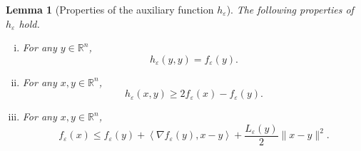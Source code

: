 \documentclass[12pt]{article}
\numberwithin{equation}{section}
\newtheorem{lemma}{Lemma}[proposition]
\begin{document}
\begin{lemma}[Properties of the auxiliary function $h_{\varepsilon}$]\label{State_h_prop}
The following properties of $h_{\varepsilon}$ hold.
\begin{enumerate}[(i)]
	\item For any $y \in \mathbb{R}^n$, \label{State_h_prop1}
	\begin{equation*}
		h_{\varepsilon}(y,y) = f_{\varepsilon}(y) .
	\end{equation*}
	\item For any $x,y \in \mathbb{R}^n$, \label{State_h_prop2}
	\begin{equation*}
		h_{\varepsilon}(x,y) \geq 2f_{\varepsilon}(x) - f_{\varepsilon}(y) .
	\end{equation*}
	\item For any $x,y \in \mathbb{R}^n$, \label{State_h_prop4}
	\begin{equation*}
		f_{\varepsilon}(x) \leq f_{\varepsilon}(y) + \left\langle \nabla f_{\varepsilon}(y), x-y \right\rangle + \frac{L_{\varepsilon}(y)}{2}\|x-y\|^2 .
	\end{equation*}
\end{enumerate}
\end{lemma}
\end{document}
